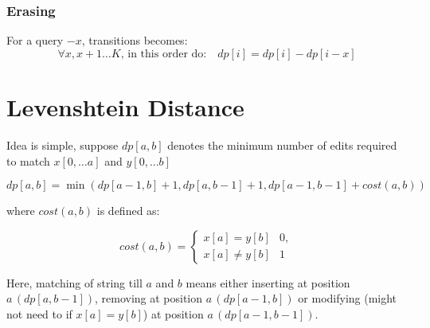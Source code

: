\documentclass{article}
\begin{document}
	\subsubsection{Erasing}
	For a query $-x$, transitions becomes:
	\[
	\forall x, x+1 \ldots K, \, \text{in this order do:} \quad dp[i] = dp[i] - dp[i-x] 
	\]
	
	\section{Levenshtein Distance}
		\begin{algorithm}[H]
			\SetAlgoLined
			\caption{Problem: Levenshtein Distance}
		\end{algorithm}
		\vspace{5mm}
	
	Idea is simple, suppose $dp[a,b]$ denotes the minimum number of edits required to match $x[0, \ldots a]$ and $y[0, \ldots b]$
	
	\[
		dp[a,b] = \min \left(dp[a-1,b] + 1, dp[a,b-1] + 1, dp[a-1,b-1] + cost(a,b)\right)	
	\]
	
	where $cost(a,b)$ is defined as:
	
	\[
	cost(a,b) = \begin{cases}
		x[a] = y[b] & 0, \\
		x[a] \neq y[b] & 1
	\end{cases}
	\]
	
	Here, matching of string till $a$ and $b$ means either inserting at position $a \, (dp[a,b-1])$, removing at position $a \, (dp[a-1,b])$ or modifying (might not need to if $x[a] = y[b]$) at position $a \, (dp[a-1,b-1])$.
	
\end{document}
